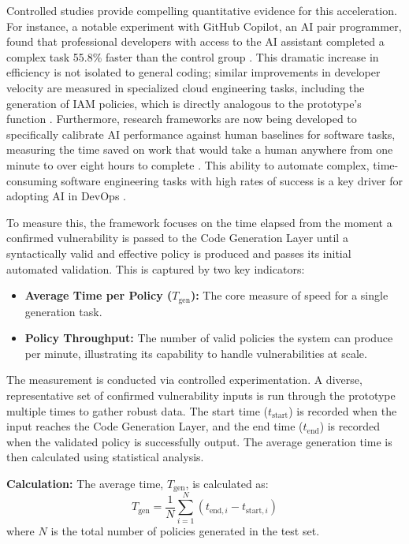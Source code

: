 Controlled studies provide compelling quantitative evidence for this acceleration. For instance, a notable experiment with GitHub Copilot, an AI pair programmer, found that professional developers with access to the AI assistant completed a complex task 55.8\% faster than the control group \cite{peng_impact_2023}. This dramatic increase in efficiency is not isolated to general coding; similar improvements in developer velocity are measured in specialized cloud engineering tasks, including the generation of IAM policies, which is directly analogous to the prototype's function \cite{kesireddy_copilot_2025}. Furthermore, research frameworks are now being developed to specifically calibrate AI performance against human baselines for software tasks, measuring the time saved on work that would take a human anywhere from one minute to over eight hours to complete \cite{rein_hcast_2025}. This ability to automate complex, time-consuming software engineering tasks with high rates of success is a key driver for adopting AI in DevOps \cite{tufano_autodev_2024}.

To measure this, the framework focuses on the time elapsed from the moment a confirmed vulnerability is passed to the Code Generation Layer until a syntactically valid and effective policy is produced and passes its initial automated validation. This is captured by two key indicators:

\begin{itemize}
    \item \textbf{Average Time per Policy ($T_{\text{gen}}$):} The core measure of speed for a single generation task.
    \item \textbf{Policy Throughput:} The number of valid policies the system can produce per minute, illustrating its capability to handle vulnerabilities at scale.
\end{itemize}

The measurement is conducted via controlled experimentation. A diverse, representative set of confirmed vulnerability inputs is run through the prototype multiple times to gather robust data. The start time ($t_{\text{start}}$) is recorded when the input reaches the Code Generation Layer, and the end time ($t_{\text{end}}$) is recorded when the validated policy is successfully output. The average generation time is then calculated using statistical analysis.

\noindent
\textbf{Calculation:} The average time, $T_{\text{gen}}$, is calculated as:
\[ T_{\text{gen}} = \frac{1}{N} \sum_{i=1}^{N} (t_{\text{end},i} - t_{\text{start},i}) \]
where $N$ is the total number of policies generated in the test set.

